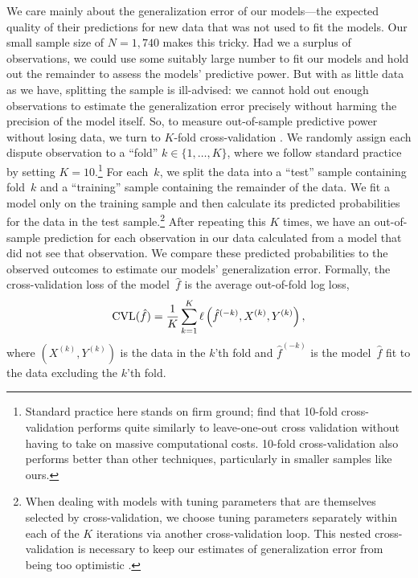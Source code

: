 We care mainly about the generalization error of our models---the expected quality of their predictions for new data that was not used to fit the models.
Our small sample size of $N = 1{,}740$ makes this tricky.
Had we a surplus of observations, we could use some suitably large number to fit our models and hold out the remainder to assess the models' predictive power.
But with as little data as we have, splitting the sample is ill-advised: we cannot hold out enough observations to estimate the generalization error precisely without harming the precision of the model itself.
So, to measure out-of-sample predictive power without losing data, we turn to $K$-fold cross-validation \citep[241--249]{Hastie:2009wpa}.
We randomly assign each dispute observation to a ``fold'' $k \in \{1, \ldots, K\}$, where we follow standard practice by setting $K = 10$.\footnote{Standard practice here stands on firm ground; \citet{molinaro2005} find that 10-fold cross-validation performs quite similarly to leave-one-out cross validation without having to take on massive computational costs.  10-fold cross-validation also performs better than other techniques, particularly in smaller samples like ours.}
For each~$k$, we split the data into a ``test'' sample containing fold~$k$ and a ``training'' sample containing the remainder of the data.
We fit a model only on the training sample and then calculate its predicted probabilities for the data in the test sample.\footnote{%
  \label{fn:nested-cv}%
  When dealing with models with tuning parameters that are themselves selected by cross-validation, we choose tuning parameters separately within each of the $K$ iterations via another cross-validation loop.
  This nested cross-validation is necessary to keep our estimates of generalization error from being too optimistic \citep{Varma:2006ch}.
}
After repeating this $K$ times, we have an out-of-sample prediction for each observation in our data calculated from a model that did not see that observation.
We compare these predicted probabilities to the observed outcomes to estimate our models' generalization error.
Formally, the cross-validation loss of the model~$\hat{f}$ is the average out-of-fold log loss,
\begin{equation}
  \label{eq:cv-loss}
  \operatorname{CVL}(\hat{f})
  =
  \frac{1}{K} \sum_{k=1}^K \ell \left(
    \hat{f}^{(-k)}, X^{(k)}, Y^{(k)}
  \right),
\end{equation}
where $(X^{(k)}, Y^{(k)})$ is the data in the $k$'th fold and $\hat{f}^{(-k)}$ is the model~$\hat{f}$ fit to the data excluding the $k$'th fold.

